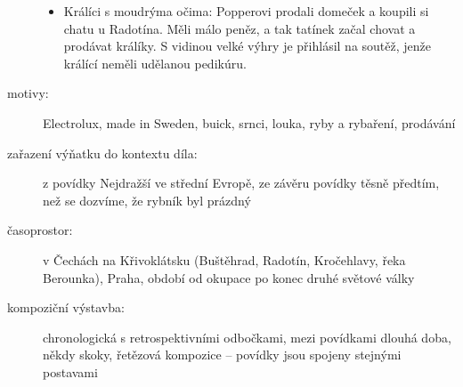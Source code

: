 \documentclass{article}
\begin{document}
\begin{description}
\begin{itemize}
   	\item Králíci s moudrýma očima: Popperovi prodali domeček a koupili si chatu u Radotína. Měli málo peněz, a tak tatínek začal chovat a prodávat králíky. S vidinou velké výhry je přihlásil na soutěž, jenže králící neměli udělanou pedikúru.
    \end{itemize}
    \item[motivy:] Electrolux, made in Sweden, buick, srnci, louka, ryby a rybaření, prodávání
    \item[zařazení výňatku do kontextu díla:] z povídky Nejdražší ve střední Evropě, ze závěru povídky těsně předtím, než se dozvíme, že rybník byl prázdný
    \item[časoprostor:] v Čechách na Křivoklátsku (Buštěhrad, Radotín, Kročehlavy, řeka Berounka), Praha, období od okupace po konec druhé světové války
    \item[kompoziční výstavba:] chronologická s retrospektivními odbočkami, mezi povídkami dlouhá doba, někdy skoky, řetězová kompozice -- povídky jsou spojeny stejnými postavami
\end{description}
\end{document}
